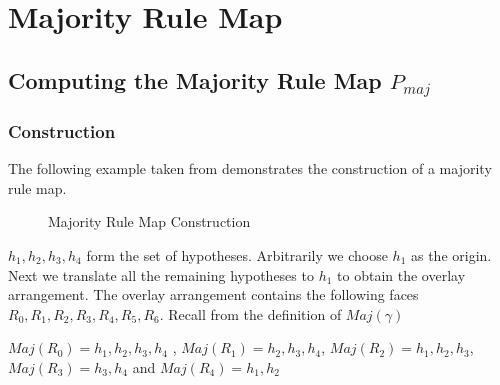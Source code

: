 \chapter{Majority Rule Map}
\ifpdf
    \graphicspath{{Chapter3/Chapter3Figs/PNG/}{Chapter3/Chapter3Figs/PDF/}{Chapter3/Chapter3Figs/}}
\else
    \graphicspath{{Chapter3/Chapter3Figs/EPS/}{Chapter3/Chapter3Figs/}}
\fi

\section{Computing the Majority Rule Map $P_{maj}$}

\subsection{Construction}
The following example taken from \cite{key1} demonstrates the construction of a majority rule map.

\begin{figure}[h]
\begin{center}
\caption{\label{fig:Construction}Majority Rule Map Construction}
\end{center}
\end{figure}

${h_{1},h_{2},h_{3},h_{4}}$ form the set of hypotheses. Arbitrarily we choose $h_{1}$ as the origin. Next we translate all the 
remaining hypotheses to $h_{1}$ to obtain the overlay arrangement. The overlay arrangement contains the following faces
$R_{0},R_{1},R_{2},R_{3},R_{4},R_{5},R_{6}$. Recall from the definition of $Maj(\gamma)$



$  Maj(R_{0})  =  {h_{1}, h_{2}, h_{3}, h_{4}} $ , $  Maj(R_{1})  =  { h_{2}, h_{3}, h_{4}} $, $ Maj(R_{2})  =  {h_{1}, h_{2}, h_{3}} $,
$  Maj(R_{3})  =  {h_{3}, h_{4}} $ and $  Maj(R_{4})  =  {h_{1}, h_{2}} $



